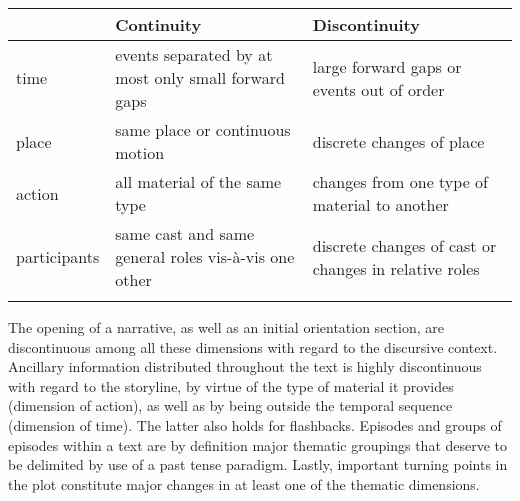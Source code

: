 \begin{table}[htb]
\begin{center}
\begin{tabularx}{\textwidth}{lXX}
\lsptoprule 
& \footnotesize{Continuity} & \footnotesize{Discontinuity}\\
\midrule
\footnotesize{time} & events separated by at most only small forward gaps & large forward gaps or events out of order\\
\footnotesize{place} & same place or continuous motion & discrete changes of place\\
\footnotesize{action} & all material of the same type & changes from one type of material to another \\
\footnotesize{participants} & same cast and same general roles vis-à-vis one other & discrete changes of cast or changes in relative roles\\
\lspbottomrule 
\end{tabularx}
\label{TableThematicContinuityDiscontinuity}
\end{center}
\end{table}

The opening of a narrative, as well as an initial orientation section, are discontinuous among all these dimensions with regard to the discursive context. Ancillary information distributed throughout the text is highly discontinuous with regard to the storyline, by virtue of the type of material it provides (dimension of action), as well as by being outside the temporal sequence (dimension of time). The latter also holds for flashbacks. Episodes and groups of episodes within a text are by definition major thematic groupings that deserve to be delimited by use of a past tense paradigm. Lastly, important turning points in the plot constitute major changes in at least one of the thematic dimensions.

